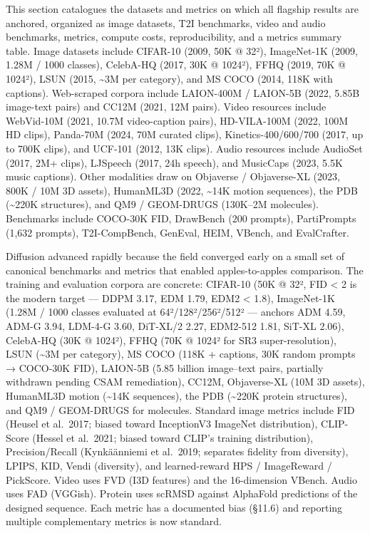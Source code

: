 \documentclass{article}
\begin{document}
This section catalogues the datasets and metrics on which all flagship results are anchored, organized as image datasets, T2I benchmarks, video and audio benchmarks, metrics, compute costs, reproducibility, and a metrics summary table. Image datasets include CIFAR-10 (2009, 50K @ 32²), ImageNet-1K (2009, 1.28M / 1000 classes), CelebA-HQ (2017, 30K @ 1024²), FFHQ (2019, 70K @ 1024²), LSUN (2015, \textasciitilde3M per category), and MS COCO (2014, 118K with captions). Web-scraped corpora include LAION-400M / LAION-5B (2022, 5.85B image-text pairs) and CC12M (2021, 12M pairs). Video resources include WebVid-10M (2021, 10.7M video-caption pairs), HD-VILA-100M (2022, 100M HD clips), Panda-70M (2024, 70M curated clips), Kinetics-400/600/700 (2017, up to 700K clips), and UCF-101 (2012, 13K clips). Audio resources include AudioSet (2017, 2M+ clips), LJSpeech (2017, 24h speech), and MusicCaps (2023, 5.5K music captions). Other modalities draw on Objaverse / Objaverse-XL (2023, 800K / 10M 3D assets), HumanML3D (2022, \textasciitilde14K motion sequences), the PDB (\textasciitilde220K structures), and QM9 / GEOM-DRUGS (130K--2M molecules). Benchmarks include COCO-30K FID, DrawBench (200 prompts), PartiPrompts (1,632 prompts), T2I-CompBench, GenEval, HEIM, VBench, and EvalCrafter.

Diffusion advanced rapidly because the field converged early on a small set of canonical benchmarks and metrics that enabled apples-to-apples comparison. The training and evaluation corpora are concrete: CIFAR-10 (50K @ 32², FID \textless{} 2 is the modern target --- DDPM 3.17, EDM 1.79, EDM2 \textless{} 1.8), ImageNet-1K (1.28M / 1000 classes evaluated at 64²/128²/256²/512² --- anchors ADM 4.59, ADM-G 3.94, LDM-4-G 3.60, DiT-XL/2 2.27, EDM2-512 1.81, SiT-XL 2.06), CelebA-HQ (30K @ 1024²), FFHQ (70K @ 1024² for SR3 super-resolution), LSUN (\textasciitilde3M per category), MS COCO (118K + captions, 30K random prompts → COCO-30K FID), LAION-5B (5.85 billion image--text pairs, partially withdrawn pending CSAM remediation), CC12M, Objaverse-XL (10M 3D assets), HumanML3D motion (\textasciitilde14K sequences), the PDB (\textasciitilde220K protein structures), and QM9 / GEOM-DRUGS for molecules. Standard image metrics include FID (Heusel et al.~2017; biased toward InceptionV3 ImageNet distribution), CLIP-Score (Hessel et al.~2021; biased toward CLIP's training distribution), Precision/Recall (Kynkäänniemi et al.~2019; separates fidelity from diversity), LPIPS, KID, Vendi (diversity), and learned-reward HPS / ImageReward / PickScore. Video uses FVD (I3D features) and the 16-dimension VBench. Audio uses FAD (VGGish). Protein uses scRMSD against AlphaFold predictions of the designed sequence. Each metric has a documented bias (§11.6) and reporting multiple complementary metrics is now standard.
\end{document}
